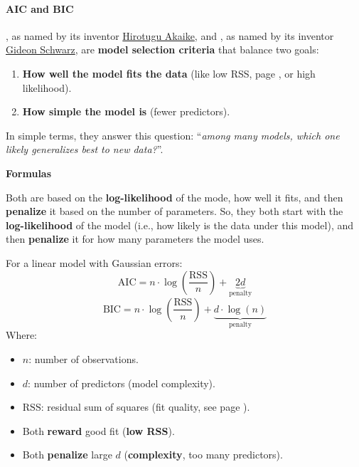 \paragraph{AIC and BIC}\label{paragraph: AIC and BIC}

, as named by its inventor \href{https://en.wikipedia.org/wiki/Hirotugu_Akaike}{Hirotugu Akaike}, and , as named by its inventor \href{https://www.jstor.org/stable/2958889}{Gideon Schwarz}\cite{bicGideonSchwarz}, are \textbf{model selection criteria} that balance two goals:
\begin{enumerate}
    \item \textbf{How well the model fits the data} (like low RSS, page \pageref{eq: RSS}, or high likelihood).
    \item \textbf{How simple the model is} (fewer predictors).
\end{enumerate}
In simple terms, they answer this question: ``\emph{among many models, which one likely generalizes best to new data?}''.

\highspace
\begin{flushleft}
    \textcolor{Green3}{ \textbf{Formulas}}
\end{flushleft}
Both are based on the \textbf{log-likelihood} of the mode, how well it fits, and then \textbf{penalize} it based on the number of parameters. So, they both start with the \textbf{log-likelihood} of the model (i.e., how likely is the data under this model), and then \textbf{penalize} it for how many parameters the model uses.

\highspace
For a linear model with Gaussian errors:
\begin{equation}
    \text{AIC} = n \cdot \log\left(\dfrac{\text{RSS}}{n}\right) + \underbrace{2d}_{\text{penalty}}
\end{equation}
\begin{equation}
    \text{BIC} = n \cdot \log\left(\dfrac{\text{RSS}}{n}\right) + \underbrace{d \cdot \log(n)}_{\text{penalty}}
\end{equation}
Where:
\begin{itemize}
    \item $n$: number of observations.
    \item $d$: number of predictors (model complexity).
    \item $\text{RSS}$: residual sum of squares (fit quality, see page \pageref{eq: RSS}).
    \item[\textcolor{Green3}{\faIcon{check-circle}}] Both \textbf{reward} good fit (\textbf{low RSS}).
    \item[\textcolor{Red2}{\faIcon{times-circle}}] Both \textbf{penalize} large $d$ (\textbf{complexity}, too many predictors).
\end{itemize}

